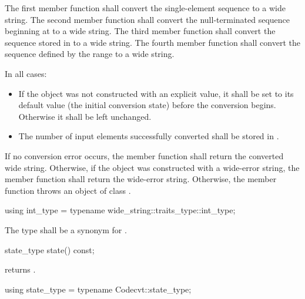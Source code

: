 \begin{itemdescr}
\pnum
\effects
The first member function shall convert the single-element sequence  to a
wide string. The second member function shall convert the null-terminated
sequence beginning at  to a wide string. The third member function
shall convert the sequence stored in  to a wide string. The fourth member
function shall convert the sequence defined by the range  to a
wide string.

\pnum
In all cases:

\begin{itemize}
\item If the  object was not constructed with an explicit value, it
shall be set to its default value (the initial conversion state) before the
conversion begins. Otherwise it shall be left unchanged.

\item The number of input elements successfully converted shall be stored in .
\end{itemize}

\pnum
\returns
If no conversion error occurs, the member function shall return the converted wide string.
Otherwise, if the object was constructed with a wide-error string, the
member function shall return the wide-error string.
Otherwise, the member function throws an object of class .
\end{itemdescr}

%
\begin{itemdecl}
using int_type = typename wide_string::traits_type::int_type;
\end{itemdecl}

\begin{itemdescr}
\pnum
The type shall be a synonym for .
\end{itemdescr}

%
\begin{itemdecl}
state_type state() const;
\end{itemdecl}

\begin{itemdescr}
\pnum
returns .
\end{itemdescr}

%
\begin{itemdecl}
using state_type = typename Codecvt::state_type;
\end{itemdecl}

